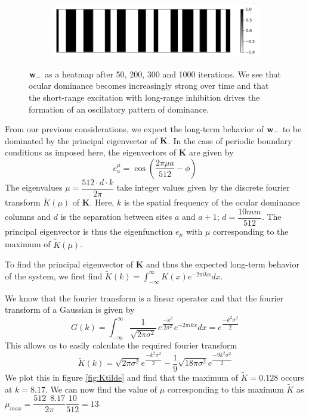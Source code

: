 \documentclass{article}
\begin{document}
\begin{figure}[h]
\begin{subfigure}[t]{0.49\linewidth}
		\centering
		\includegraphics[width = 1.0\linewidth, trim={0 0 0 0}, clip=true]{figures/occsim_int/i1000.png}
	\end{subfigure}%
\caption{${\bf w}_-$ as a heatmap after 50, 200, 300 and 1000 iterations. We see that ocular dominance becomes increasingly strong over time and that the short-range excitation with long-range inhibition drives the formation of an oscillatory pattern of dominance.}
\label{fig:occsim_int}
\end{figure}



From our previous considerations, we expect the long-term behavior of ${\bf w}_-$ to be dominated by the principal eigenvector of $\bf K$.
In the case of periodic boundary conditions as imposed here, the eigenvectors of \textbf{K} are given by
\begin{equation}
e_a^\mu = \cos{(\dfrac{2 \pi \mu a}{512}-\phi)}
\end{equation}
The eigenvalues $\mu = \dfrac{512 \cdot d \cdot k}{2 \pi}$ take integer values given by the discrete fourier transform $\tilde K(\mu) $ of \textbf{K}.
Here, $k$ is the spatial frequency of the ocular dominance columns and $d$ is the separation between sites $a$ and $a+1$; $d = \dfrac{10 mm}{512}$. The principal eigenvector is thus the eigenfunction $e_\mu$ with $\mu$ corresponding to the maximum of $\tilde K(\mu)$.

To find the principal eigenvector of \textbf{K} and thus the expected long-term behavior of the system, we first find $\tilde K(k) =
 \int_{-\infty}^\infty{K(x) e^{-2 \pi i k x} dx }
$.

We know that the fourier transform is a linear operator and that the fourier transform of a Gaussian is given by
\begin{equation}
G(k) = \int_{-\infty}^\infty{ \dfrac{1}{\sqrt{2 \pi \sigma^2}} \, e^{\dfrac{-x^2}{2 \sigma^2}} e^{-2 \pi i k x} dx } 
= e^{\dfrac{-k^2 \sigma^2}{2}}
\end{equation}
This allows us to easily calculate the required fourier transform
\begin{equation}
\tilde K(k) = \sqrt{2 \pi \sigma^2} e^{ \dfrac{- k^2 \sigma^2}{2} } - \dfrac{1}{9} \sqrt{18 \pi \sigma^2 } e^{\dfrac{-9 k^2 \sigma^2}{2}}
\end{equation}
We plot this in figure \ref{fig:Ktilde} and find that the maximum of $\tilde K = 0.128$ occurs at $k = 8.17$. We can now find the value of $\mu$ corresponding to this maximum $\tilde K$ as
$
\mu_{max} = \dfrac{512 \,\,\, 8.17}{2 \pi} \dfrac{10}{512} = 13
$.
\end{document}
